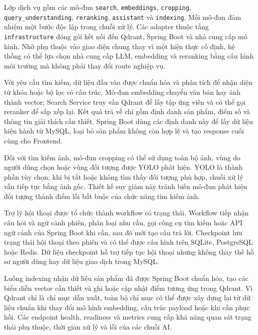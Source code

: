 Lớp dịch vụ gồm các mô-đun \texttt{search}, \texttt{embeddings}, \texttt{cropping}, \texttt{query\_understanding}, \texttt{reranking}, \texttt{assistant} và \texttt{indexing}. Mỗi mô-đun đảm nhiệm một bước độc lập trong chuỗi xử lý. Các adapter thuộc tầng \texttt{infrastructure} đóng gói kết nối đến Qdrant, Spring Boot và nhà cung cấp mô hình. Nhờ phụ thuộc vào giao diện chung thay vì một hiện thực cố định, hệ thống có thể lựa chọn nhà cung cấp LLM, embedding và reranking bằng cấu hình môi trường mà không phải thay đổi route nghiệp vụ.

Với yêu cầu tìm kiếm, dữ liệu đầu vào được chuẩn hóa và phân tích để nhận diện từ khóa hoặc bộ lọc có cấu trúc. Mô-đun embedding chuyển văn bản hay ảnh thành vector; Search Service truy vấn Qdrant để lấy tập ứng viên và có thể gọi reranker để sắp xếp lại. Kết quả trả về chỉ gồm định danh sản phẩm, điểm số và thông tin giải thích cần thiết. Spring Boot dùng các định danh này để lấy dữ liệu hiện hành từ MySQL, loại bỏ sản phẩm không còn hợp lệ và tạo response cuối cùng cho Frontend.

Đối với tìm kiếm ảnh, mô-đun cropping có thể sử dụng toàn bộ ảnh, vùng do người dùng chọn hoặc vùng đối tượng được YOLO phát hiện. YOLO là thành phần tùy chọn; khi bị tắt hoặc không tìm thấy đối tượng phù hợp, chuỗi xử lý vẫn tiếp tục bằng ảnh gốc. Thiết kế suy giảm này tránh biến mô-đun phát hiện đối tượng thành điểm lỗi bắt buộc của chức năng tìm kiếm ảnh.

Trợ lý hội thoại được tổ chức thành workflow có trạng thái. Workflow tiếp nhận câu hỏi và ngữ cảnh phiên, phân loại nhu cầu, gọi công cụ tìm kiếm hoặc API ngữ cảnh của Spring Boot khi cần, sau đó mới tạo câu trả lời. Checkpoint lưu trạng thái hội thoại theo phiên và có thể được cấu hình trên SQLite, PostgreSQL hoặc Redis. Dữ liệu checkpoint hỗ trợ tiếp tục hội thoại nhưng không thay thế hồ sơ người dùng hay dữ liệu giao dịch trong MySQL.

Luồng indexing nhận dữ liệu sản phẩm đã được Spring Boot chuẩn hóa, tạo các biểu diễn vector cần thiết và ghi hoặc cập nhật điểm tương ứng trong Qdrant. Vì Qdrant chỉ là chỉ mục dẫn xuất, toàn bộ chỉ mục có thể được xây dựng lại từ dữ liệu chuẩn khi thay đổi mô hình embedding, cấu trúc payload hoặc khi cần phục hồi. Các endpoint health, readiness và metrics cung cấp khả năng quan sát trạng thái phụ thuộc, thời gian xử lý và lỗi của các chuỗi AI.

